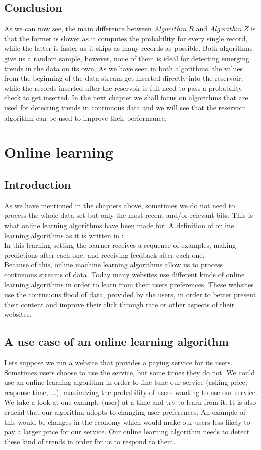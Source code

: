 \documentclass[journal]{IEEEtran/IEEEtran}
\begin{document}
\subsection{Conclusion}
As we can now see, the main difference between $Algorithm\ R$ and $Algorithm\ Z$ is that the former is slower as it computes the probability for every single record, while the latter is faster as it skips as many records as possible. Both algorithms give us a random sample, however, none of them is ideal for detecting emerging trends in the data on its own. As we have seen in both algorithms, the values from the beginning of the data stream get inserted directly into the reservoir, while the records inserted after the reservoir is full need to pass a probability check to get inserted. In the next chapter we shall focus on algorithms that are used for detecting trends in continuous data and we will see that the reservoir algorithm can be used to improve their performance.
\section{Online learning}
\subsection{Introduction}
As we have mentioned in the chapters above, sometimes we do not need to process the whole data set but only the most recent and/or relevant bits. This is what online learning algorithms have been made for. A definition of online learning algorithms as it is written in \cite{learning}:\\

In this learning setting the learner receives a sequence of examples, making predictions after each one, and receiving feedback after each one.\\ 

Because of this, online machine learning algorithms allow us to process continuous streams of data. Today many websites use different kinds of online learning algorithms in order to learn from their users preferences. These websites use the continuous flood of data, provided by the users, in order to better present their content and improve their click through rate or other aspects of their websites. 
\subsection{A use case of an online learning algorithm}
Lets suppose we run a website that provides a paying service for its users. Sometimes users choose to use the service, but some times they do not. We could use an online learning algorithm in order to fine tune our service (asking price, response time, ...), maximizing the probability of users wanting to use our service. We take a look at one example (user) at a time and try to learn from it. It is also crucial that our algorithm adopts to changing user preferences. An example of this would be changes in the economy which would make our users less likely to pay a larger price for our service. Our online learning algorithm needs to detect these kind of trends in order for us to respond to them. 
\end{document}

